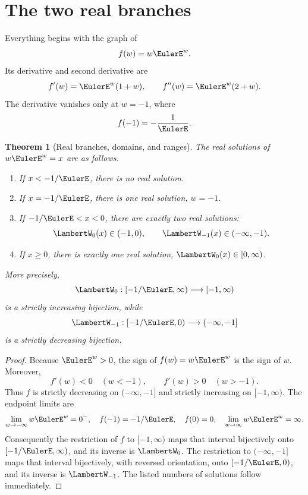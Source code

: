 \documentclass[11pt]{article}
\newtheorem{theorem}{Theorem}[section]
\theoremstyle{remark}
\newcommand{\Wz}{\LambertW_{0}}
\newcommand{\Wm}{\LambertW_{-1}}
\begin{document}
\section{The two real branches}\label{sec:realbranches}

Everything begins with the graph of
\[
       f(w)=w\EulerE^w.
\]
Its derivative and second derivative are
\[
       f'(w)=\EulerE^w(1+w),\qquad
       f''(w)=\EulerE^w(2+w).
\]
The derivative vanishes only at \(w=-1\), where
\[
       f(-1)=-\frac1\EulerE.
\]

\begin{theorem}[Real branches, domains, and ranges]\label{thm:realbranches}
The real solutions of \(w\EulerE^w=x\) are as follows.
\begin{enumerate}[label=\textup{(\roman*)}]
\item If \(x<-1/\EulerE\), there is no real solution.
\item If \(x=-1/\EulerE\), there is one real solution, \(w=-1\).
\item If \(-1/\EulerE<x<0\), there are exactly two real solutions:
\[
  \Wz(x)\in(-1,0),\qquad \Wm(x)\in(-\infty,-1).
\]
\item If \(x\geq0\), there is exactly one real solution,
\(\Wz(x)\in[0,\infty)\).
\end{enumerate}
More precisely,
\[
 \Wz:[-1/\EulerE,\infty)\longrightarrow[-1,\infty)
\]
is a strictly increasing bijection, while
\[
 \Wm:[-1/\EulerE,0)\longrightarrow(-\infty,-1]
\]
is a strictly decreasing bijection.
\end{theorem}

\begin{proof}
Because \(\EulerE^w>0\), the sign of \(f(w)=w\EulerE^w\) is the sign of \(w\).
Moreover,
\[
 f'(w)<0\quad(w<-1),\qquad f'(w)>0\quad(w>-1).
\]
Thus \(f\) is strictly decreasing on \((-\infty,-1]\) and strictly
increasing on \([-1,\infty)\).  The endpoint limits are
\[
 \lim_{w\to-\infty}w\EulerE^w=0^-,
 \quad f(-1)=-1/\EulerE,\quad f(0)=0,\quad
 \lim_{w\to\infty}w\EulerE^w=\infty.
\]
Consequently the restriction of \(f\) to \([-1,\infty)\) maps that interval
bijectively onto \([-1/\EulerE,\infty)\), and its inverse is \(\Wz\).  The
restriction to \((-\infty,-1]\) maps that interval bijectively, with reversed
orientation, onto \([-1/\EulerE,0)\), and its inverse is \(\Wm\).  The listed
numbers of solutions follow immediately.
\end{proof}
\end{document}
